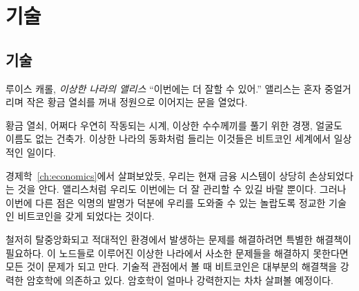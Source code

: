 \part{기술}
\label{ch:technology}
\chapter*{기술}

\begin{comment}
	\begin{chapquote}{Lewis Carroll, \textit{Alice in Wonderland}}
		\enquote{Now, I'll manage better this time} she said to herself, and began by taking
		the little golden key, and unlocking the door that led into the garden
	\end{chapquote}
\end{comment}
\begin{chapquote}{루이스 캐롤, \textit{이상한 나라의 앨리스}}
	\enquote{이번에는 더 잘할 수 있어.} 앨리스는 혼자 중얼거리며 작은 황금 열쇠를 꺼내 정원으로 이어지는 문을 열었다.
\end{chapquote}

\begin{comment}
	Golden keys, clocks which only work by chance, races to solve
	strange riddles, and builders that don't have faces or names. What sounds like
	fairy tales from Wonderland is daily business in the world of Bitcoin.
\end{comment}
황금 열쇠, 어쩌다 우연히 작동되는 시계, 이상한 수수께끼를 풀기 위한 경쟁, 얼굴도 이름도 없는 건축가.
이상한 나라의 동화처럼 들리는 이것들은 비트코인 세계에서 일상적인 일이다.

\begin{comment}
	As we explored in Chapter~\ref{ch:economics}, large parts of the current financial system are systematically broken. 
	Like Alice, we can only hope to manage better this time. 
	But, thanks to a pseudonymous inventor, we have incredibly sophisticated technology to support us this time around: Bitcoin.
\end{comment}
경제학~\ref{ch:economics}에서 살펴보았듯, 우리는 현재 금융 시스템이 상당히 손상되었다는 것을 안다.
앨리스처럼 우리도 이번에는 더 잘 관리할 수 있길 바랄 뿐이다.
그러나 이번에 다른 점은 익명의 발명가 덕분에 우리를 도와줄 수 있는 놀랍도록 정교한 기술인 비트코인을 갖게 되었다는 것이다. 

\begin{comment}
	Solving problems in a radically decentralized and adversarial environment
	requires unique solutions. What would otherwise be trivial problems to solve
	are everything but in this strange world of nodes. Bitcoin relies on strong
	cryptography for most solutions, at least if looked at through the lens of
	technology. Just how strong this cryptography is will be explored in one of the
	following lessons.
\end{comment}
철저히 탈중앙화되고 적대적인 환경에서 발생하는 문제를 해결하려면 특별한 해결책이 필요하다.
이 노드들로 이루어진 이상한 나라에서 사소한 문제들을 해결하지 못한다면 모든 것이 문제가 되고 만다.
기술적 관점에서 볼 때 비트코인은 대부분의 해결책을 강력한 암호학에 의존하고 있다. 
암호학이 얼마나 강력한지는 차차 살펴볼 예정이다.

